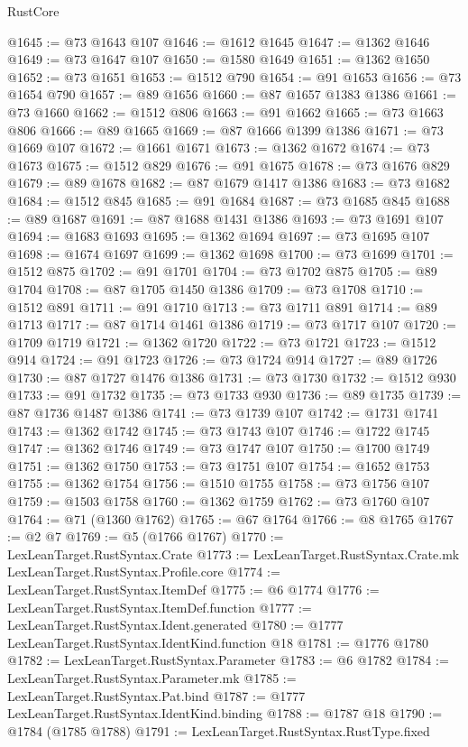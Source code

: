 \begin{lexlean}{RustCore}
\begin{coremodule}
@1645 := @73 @1643 @107
@1646 := @1612 @1645
@1647 := @1362 @1646
@1649 := @73 @1647 @107
@1650 := @1580 @1649
@1651 := @1362 @1650
@1652 := @73 @1651
@1653 := @1512 @790
@1654 := @91 @1653
@1656 := @73 @1654 @790
@1657 := @89 @1656
@1660 := @87 @1657 @1383 @1386
@1661 := @73 @1660
@1662 := @1512 @806
@1663 := @91 @1662
@1665 := @73 @1663 @806
@1666 := @89 @1665
@1669 := @87 @1666 @1399 @1386
@1671 := @73 @1669 @107
@1672 := @1661 @1671
@1673 := @1362 @1672
@1674 := @73 @1673
@1675 := @1512 @829
@1676 := @91 @1675
@1678 := @73 @1676 @829
@1679 := @89 @1678
@1682 := @87 @1679 @1417 @1386
@1683 := @73 @1682
@1684 := @1512 @845
@1685 := @91 @1684
@1687 := @73 @1685 @845
@1688 := @89 @1687
@1691 := @87 @1688 @1431 @1386
@1693 := @73 @1691 @107
@1694 := @1683 @1693
@1695 := @1362 @1694
@1697 := @73 @1695 @107
@1698 := @1674 @1697
@1699 := @1362 @1698
@1700 := @73 @1699
@1701 := @1512 @875
@1702 := @91 @1701
@1704 := @73 @1702 @875
@1705 := @89 @1704
@1708 := @87 @1705 @1450 @1386
@1709 := @73 @1708
@1710 := @1512 @891
@1711 := @91 @1710
@1713 := @73 @1711 @891
@1714 := @89 @1713
@1717 := @87 @1714 @1461 @1386
@1719 := @73 @1717 @107
@1720 := @1709 @1719
@1721 := @1362 @1720
@1722 := @73 @1721
@1723 := @1512 @914
@1724 := @91 @1723
@1726 := @73 @1724 @914
@1727 := @89 @1726
@1730 := @87 @1727 @1476 @1386
@1731 := @73 @1730
@1732 := @1512 @930
@1733 := @91 @1732
@1735 := @73 @1733 @930
@1736 := @89 @1735
@1739 := @87 @1736 @1487 @1386
@1741 := @73 @1739 @107
@1742 := @1731 @1741
@1743 := @1362 @1742
@1745 := @73 @1743 @107
@1746 := @1722 @1745
@1747 := @1362 @1746
@1749 := @73 @1747 @107
@1750 := @1700 @1749
@1751 := @1362 @1750
@1753 := @73 @1751 @107
@1754 := @1652 @1753
@1755 := @1362 @1754
@1756 := @1510 @1755
@1758 := @73 @1756 @107
@1759 := @1503 @1758
@1760 := @1362 @1759
@1762 := @73 @1760 @107
@1764 := @71 (@1360 @1762)
@1765 := @67 @1764
@1766 := @8 @1765
@1767 := @2 @7
@1769 := @5 (@1766 @1767)
@1770 := LexLeanTarget.RustSyntax.Crate
@1773 := LexLeanTarget.RustSyntax.Crate.mk LexLeanTarget.RustSyntax.Profile.core
@1774 := LexLeanTarget.RustSyntax.ItemDef
@1775 := @6 @1774
@1776 := LexLeanTarget.RustSyntax.ItemDef.function
@1777 := LexLeanTarget.RustSyntax.Ident.generated
@1780 := @1777 LexLeanTarget.RustSyntax.IdentKind.function @18
@1781 := @1776 @1780
@1782 := LexLeanTarget.RustSyntax.Parameter
@1783 := @6 @1782
@1784 := LexLeanTarget.RustSyntax.Parameter.mk
@1785 := LexLeanTarget.RustSyntax.Pat.bind
@1787 := @1777 LexLeanTarget.RustSyntax.IdentKind.binding
@1788 := @1787 @18
@1790 := @1784 (@1785 @1788)
@1791 := LexLeanTarget.RustSyntax.RustType.fixed

\end{coremodule}
\end{lexlean}
